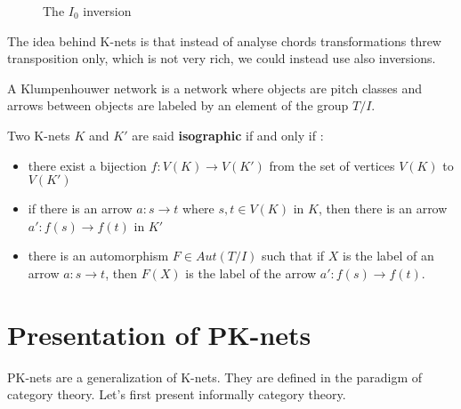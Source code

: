 \documentclass{report}
\begin{document}
\begin{figure}[ht]
    \centering
    \caption{The $I_0$ inversion}
    \label{inversions}
\end{figure}

The idea behind K-nets is that instead of analyse chords transformations threw transposition only, which is not very rich, we could instead use also inversions.

\begin{defn}
    A Klumpenhouwer network is a network where objects are pitch classes and arrows between objects are labeled by an element of the group $T/I$.
\end{defn}

\begin{defn}
    Two K-nets $K$ and $K'$ are said \textbf{isographic} if and only if :
    \begin{itemize}
        \item there exist a bijection $f:V(K)\rightarrow V(K')$ from the set of vertices $V(K)$ to $V(K')$
        \item if there is an arrow $a:s\rightarrow t$ where $s,t\in V(K)$ in $K$, then there is an arrow $a':f(s)\rightarrow f(t)$ in $K'$
        \item there is an automorphism $F \in Aut(T/I)$ such that if $X$ is the label of an arrow $a:s\rightarrow t$, then $F(X)$ is the label of the arrow $a':f(s)\rightarrow f(t)$.
    \end{itemize}
\end{defn}




\section{Presentation of PK-nets}

PK-nets\cite{PAAE2016} are a generalization of K-nets. They are defined in the paradigm of category theory. Let's first present informally category theory.
\end{document}
